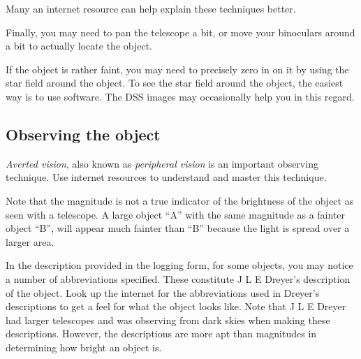 Many an internet resource can help explain these techniques better.

Finally, you may need to pan the telescope a bit, or move your
binoculars around a bit to actually locate the object.

If the object is rather faint, you may need to precisely zero in on it
by using the star field around the object. To see the star field
around the object, the easiest way is to use software. The DSS images
may occasionally help you in this regard.

\subsection{Observing the object}

\emph{Averted vision}, also known as \emph{peripheral vision} is an
important observing technique. Use internet resources to understand
and master this technique.

Note that the magnitude is not a true indicator of the brightness of
the object as seen with a telescope. A large object ``A'' with the
same magnitude as a fainter object ``B'', will appear much fainter
than ``B'' because the light is spread over a larger area.

In the description provided in the logging form, for some objects, you
may notice a number of abbreviations specified. These constitute J L E
Dreyer's description of the object. Look up the internet for the
abbreviations used in Dreyer's descriptions to get a feel for what the
object looks like. Note that J L E Dreyer had larger telescopes and
was observing from dark skies when making these descriptions. However,
the descriptions are more apt than magnitudes in determining how
bright an object is.

